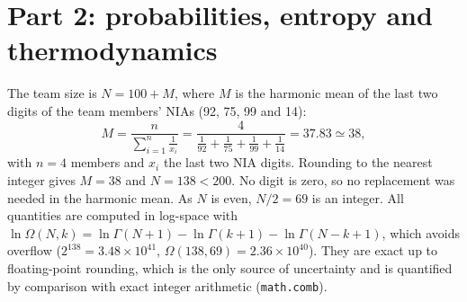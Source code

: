 \documentclass[11pt,a4paper]{article}
\newcommand{\Om}{\Omega}
\begin{document}
\section{Part 2: probabilities, entropy and thermodynamics}
The team size is $N=100+M$, where $M$ is the harmonic mean of the last two digits of the team members' NIAs (92, 75, 99 and 14):
\begin{equation}
M=\frac{n}{\sum_{i=1}^{n}\frac{1}{x_i}}=\frac{4}{\frac1{92}+\frac1{75}+\frac1{99}+\frac1{14}}=37.83\simeq38,\label{eq:M}
\end{equation}
with $n=4$ members and $x_i$ the last two NIA digits. Rounding to the nearest integer gives $M=38$ and $N=138<200$.
No digit is zero, so no replacement was needed in the harmonic mean. As $N$ is even, $N/2=69$ is an
integer. All quantities are computed in log-space with
$\ln\Om(N,k)=\ln\Gamma(N+1)-\ln\Gamma(k+1)-\ln\Gamma(N-k+1)$, which avoids overflow
($2^{138}=3.48\times10^{41}$, $\Om(138,69)=2.36\times10^{40}$). They are exact up to floating-point rounding, which is
the only source of uncertainty and is quantified by comparison with exact integer arithmetic
(\texttt{math.comb}).
\end{document}
